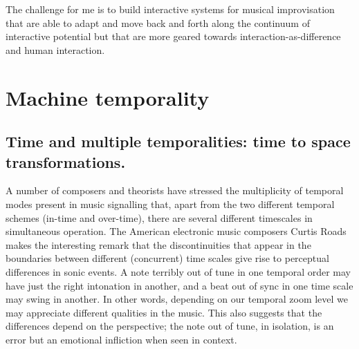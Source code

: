 \documentclass{article}
\begin{document}
The challenge for me is to build interactive systems for musical improvisation that are able to adapt and move back and forth along the continuum of interactive potential but that are more geared towards interaction-as-difference and human interaction.


\section{Machine temporality}
\label{sec:machine-temporality}


\subsection{Time and multiple temporalities: time to space transformations.}
\label{subsec:time-mult-temp}

A number of composers and theorists have stressed the multiplicity of temporal modes present in music signalling that, apart from the two different temporal schemes (in-time and over-time), there are several different timescales in simultaneous operation. 
The American electronic music composers Curtis Roads makes the interesting remark that the discontinuities that appear in the boundaries between different (concurrent) time scales give rise to perceptual differences in sonic events. \citep[4]{roads}  A note terribly out of tune in one temporal order may have just the right intonation in another, and a beat out of sync in one time scale may swing in another. \citep[For an example of the great variation in rhythmic timing among jazz musicians when observed at high temporal resolution, see][]{friberg02} In other words, depending on our temporal zoom level we may appreciate different qualities in the music. This also suggests that the differences depend on the perspective; the note out of tune, in isolation, is an error but an emotional infliction when seen in context. 
\end{document}
